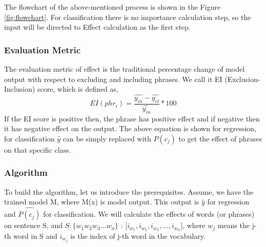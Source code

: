 \documentclass[11pt]{article}
\begin{document}
The flowchart of the above-mentioned process is shown in the Figure \ref{fig:flowchart}. For classification there is no importance calculation step, so the input will be directed to Effect calculation as the first step.


\subsubsection{Evaluation Metric}
The evaluation metric of effect is the traditional percentage change of model output with respect to excluding and including phrases. We call it EI (Exclusion-Inclusion) score, which is defined as,
\begin{equation}
	EI(phr_i) = \frac{\hat{y_{in}} - \hat{y_{el}}}{\hat{y_{in}}} * 100
\end{equation}
If the EI score is positive then, the phrase has positive effect and if negative then it has negative effect on the output. The above equation is shown for regression, for classification $\hat{y}$ can be simply replaced with $P(c_j)$ to get the effect of phrases on that specific class.



\subsubsection {Algorithm}
To build the algorithm, let us introduce the prerequisites. Assume, we have the trained model M, where M(x) is model output. This output is $\hat{y}$ for regression and $\hat{P(c_j)}$ for classification. We will calculate the effects of words (or phrases) on sentence S, and $S : \{w_1 w_2 w_3 ... w_n\}$ : [$i_{w_1}, i_{w_2}, i_{w_3}, ... , i_{w_n}$], where $w_j$ means the j-th word in S and $i_{w_j}$ is the index of j-th word in the vocabulary. 
\end{document}
